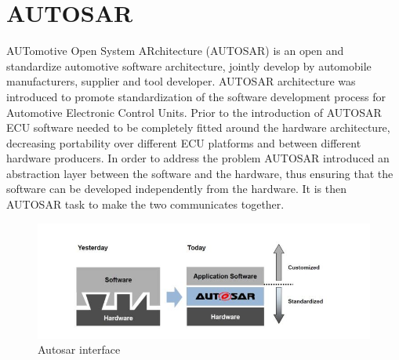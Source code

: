 \documentclass[../main.tex]{subfiles}
\begin{document}
\section{AUTOSAR}
AUTomotive Open System ARchitecture (\gls{AUTOSAR}) is an open and standardize automotive software architecture, jointly develop by automobile manufacturers, supplier and tool developer. \gls{AUTOSAR} architecture was introduced to promote standardization of the software development process for Automotive Electronic Control Units. Prior to the introduction of \gls{AUTOSAR} \gls{ECU} software needed to be completely fitted around the hardware architecture, decreasing portability over different \gls{ECU} platforms and between different hardware producers. 
In order to address the problem \gls{AUTOSAR} introduced an abstraction layer between the software and the hardware, thus ensuring that the software can be developed independently from the hardware. It is then \gls{AUTOSAR} task to make the two communicates together.
\begin{figure}[h]
    \centering
    \includegraphics[width=\linewidth]{images_folder/autosarcapture.jpg}
    \caption{Autosar interface}
    \label{fig:AUTCA}
\end{figure}
\end{document}
